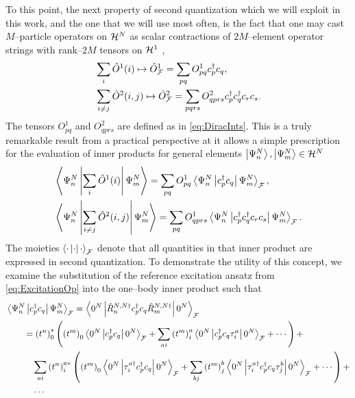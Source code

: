 To this point, the next property of second quantization which we will exploit in this work,
and the one that we will use most often, is the fact that one may
cast $M$--particle operators on $\mathcal{H}^N$ as scalar contractions of $2M$--element operator 
strings with rank--$2M$ tensors on $\mathcal{H}^1$ \cite{Walecka12_book,Schuck04_book,Ostlund12_book},
\begin{subequations}
\label{eq:SeQuantOp}
\begin{align}
  &\sum_i \hat{O}^1(i) \mapsto \hat{O}_{\mathcal{F}}^1 = \sum_{pq}   O^1_{pq} c^\dagger_p c_q,\\
  &\sum_{i\neq j}\hat{O}^2(i,j) \mapsto \hat{O}_{\mathcal{F}}^2 = \sum_{pqrs} O^2_{qprs} c^\dagger _p c^\dagger _q c_r c_s.
\end{align}
\end{subequations}
The tensors $O^1_{pq}$ and $O^2_{qprs}$ are defined as in \cref{eq:DiracInts}. This is a truly remarkable
result from a practical perspective at it allows a simple prescription  for the evaluation of 
inner products for general elements $\left\vert \Psi_n^N \right\rangle, \left\vert \Psi_m^N \right\rangle \in \mathcal{H}^N$
\begin{subequations}
\label{eq:SeQuantInner}
\begin{align}
&\left\langle \Psi_n^N \left\vert \sum_i \hat{O}^1(i) \right\vert \Psi_m^N \right\rangle = \sum_{pq} O^1_{pq} \left\langle \Psi_n^N \left\vert c_p^\dagger c_q \right\vert \Psi_m^N \right\rangle_{\mathcal{F}}, \\
&\left\langle \Psi_n^N \left\vert \sum_{i\neq j} \hat{O}^2(i,j) \right\vert \Psi_m^N \right\rangle = \sum_{pq} O^1_{qprs} \left\langle \Psi_n^N \left\vert c_p^\dagger c_q^\dagger c_r c_s \right\vert \Psi_m^N \right\rangle_{\mathcal{F}}.
\end{align}
\end{subequations}
The moieties $\left\langle \cdot \left\vert \cdot \right\vert \cdot \right\rangle_{\mathcal{F}}$ denote that all quantities in that inner product are expressed in second quantization.
To demonstrate the utility of this concept, we examine the substitution of the reference excitation ansatz from \cref{eq:ExcitationOp}
into the one--body inner product such that
\begin{align}
\label{eq:SeQuantInnerExp}
&\left\langle \Psi_n^N \left\vert c_p^\dagger c_q \right\vert \Psi_m^N \right\rangle_{\mathcal{F}} = \left\langle 0^N \left\vert \hat{R}^{N,N\dagger}_n c_p^\dagger c_q \hat{R}^{N,N\dagger}_m \right\vert 0^N \right\rangle_{\mathcal{F}} \nonumber \\
&\qquad= \left( t^n \right)^*_0 \left(
     \left( t^m \right)_0 \left\langle 0^N \left\vert c_p^\dagger c_q \right\vert 0^N \right\rangle_{\mathcal{F}} +
     \sum_{ai} \left( t^m \right)^{a}_i \left\langle 0^N \left\vert c_p^\dagger c_q \tau^{a}_i \right\vert 0^N \right\rangle_{\mathcal{F}} + \cdots
   \right) + \nonumber \\
&\qquad \quad \sum_{ai}\left( t^n \right)^{a*}_i \left(
         \left( t^m \right)_0 \left\langle 0^N \left\vert \tau_i^{a\dagger} c_p^\dagger c_q \right\vert 0^N \right\rangle_{\mathcal{F}} +
         \sum_{bj} \left( t^m \right)^{b}_j \left\langle 0^N \left\vert \tau_i^{a\dagger} c_p^\dagger c_q \tau^{b}_j \right\vert 0^N \right\rangle_{\mathcal{F}} + \cdots
       \right) + \nonumber\\
&\qquad \quad \cdots
\end{align}
